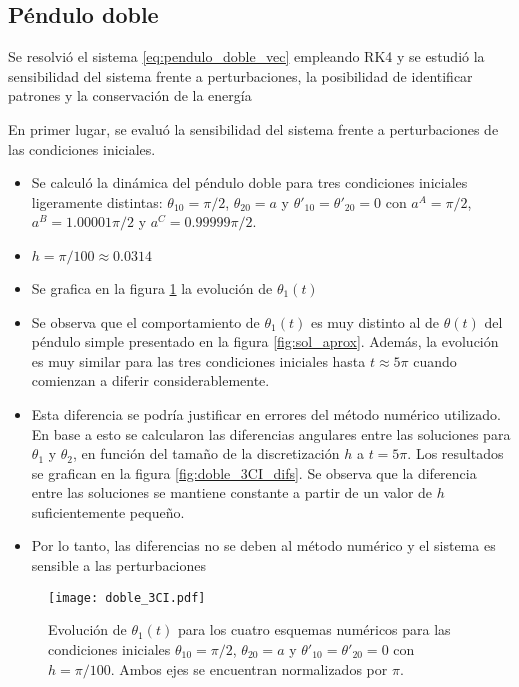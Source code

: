 \documentclass[aps,prb,twocolumn,superscriptaddress,floatfix,longbibliography]{revtex4-2}
\newcounter{para}
\begin{document}
\twocolumngrid

\subsection{Péndulo doble}

Se resolvió el sistema \ref{eq:pendulo_doble_vec} empleando RK4 y se estudió la sensibilidad del sistema frente a perturbaciones, la posibilidad de identificar patrones y la conservación de la energía

En primer lugar, se evaluó la sensibilidad del sistema frente a perturbaciones de las condiciones iniciales.
\begin{itemize}
  \item Se calculó la dinámica del péndulo doble para tres condiciones iniciales ligeramente distintas: $\theta_{1 0} = \pi/2$, $\theta_{2 0} = a$ y $\theta'_{1 0} = \theta'_{2 0} = 0$ con $a^A = \pi/2$, $a^B = 1.00001 \pi/2$ y $a^C = 0.99999 \pi/2$.
  \item $h = \pi/100 \approx 0.0314$
  \item Se grafica en la figura \ref{fig:doble_3CI} la evolución de $\theta_1(t)$
  \item Se observa que el comportamiento de $\theta_1(t)$ es muy distinto al de $\theta(t)$ del péndulo simple presentado en la figura \ref{fig:sol_aprox}. Además, la evolución es muy similar para las tres condiciones iniciales hasta $t \approx 5 \pi$ cuando comienzan a diferir considerablemente.
  \item Esta diferencia se podría justificar en errores del método numérico utilizado. En base a esto se calcularon las diferencias angulares entre las soluciones para $\theta_1$ y $\theta_2$, en función del tamaño de la discretización $h$ a $t = 5 \pi$. Los resultados se grafican en la figura \ref{fig:doble_3CI_difs}. Se observa que la diferencia entre las soluciones se mantiene constante a partir de un valor de $h$ suficientemente pequeño.
  \item Por lo tanto, las diferencias no se deben al método numérico y el sistema es sensible a las perturbaciones
\end{itemize}


\begin{figure}[h]
  \texttt{[image: doble\_3CI.pdf]}
  \caption{Evolución de $\theta_1(t)$ para los cuatro esquemas numéricos para las condiciones iniciales $\theta_{1 0} = \pi/2$, $\theta_{2 0} = a$ y $\theta'_{1 0} = \theta'_{2 0} = 0$ con $h = \pi/100$. Ambos ejes se encuentran normalizados por $\pi$.}
   \label{fig:doble_3CI}
\end{figure}
\end{document}
